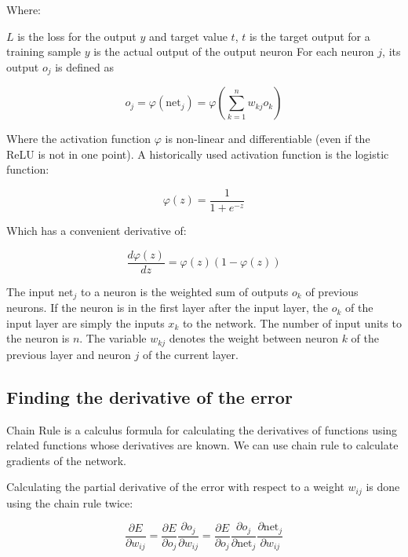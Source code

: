 Where:

$L$ is the loss for the output $y$ and target value $t$,
$t$ is the target output for a training sample
$y$ is the actual output of the output neuron
For each neuron $j$, its output $o_{j}$ is defined as

\begin{equation}
    \label{eq:gradient_net_output}
    o_{j}=\varphi ({\text{net}}_{j})=\varphi \left(\sum _{k=1}^{n}w_{kj}o_{k}\right)
\end{equation}

Where the activation function $\varphi$  is non-linear and differentiable (even if the ReLU is not in one point). A historically used activation function is the logistic function:

\begin{equation}
    \label{eq:activation}
    \varphi (z)={\frac {1}{1+e^{-z}}}
\end{equation}

Which has a convenient derivative of:

\begin{equation}
    \label{eq:activation_derivative}
    \frac {d\varphi (z)}{dz}=\varphi (z)(1-\varphi (z))
\end{equation}

The input $\text{net}_{j}$ to a neuron is the weighted sum of outputs $o_k$ of previous neurons. If the neuron is in the first layer after the input layer, the $o_k$ of the input layer are simply the inputs $x_{k}$ to the network. The number of input units to the neuron is $n$. The variable $w_{kj}$ denotes the weight between neuron $k$ of the previous layer and neuron $j$ of the current layer.

\subsection{Finding the derivative of the error}

Chain Rule is a calculus formula for calculating the derivatives of functions using related functions whose derivatives are known. We can use chain rule to calculate gradients of the network.

Calculating the partial derivative of the error with respect to a weight $w_{ij}$ is done using the chain rule twice:

\begin{equation}
    \label{eq:chain-1}
    {\frac {\partial E}{\partial w_{ij}}}={\frac {\partial E}{\partial o_{j}}}{\frac {\partial o_{j}}{\partial w_{ij}}}={\frac {\partial E}{\partial o_{j}}}{\frac {\partial o_{j}}{\partial {\text{net}}_{j}}}{\frac {\partial {\text{net}}_{j}}{\partial w_{ij}}}
\end{equation}

